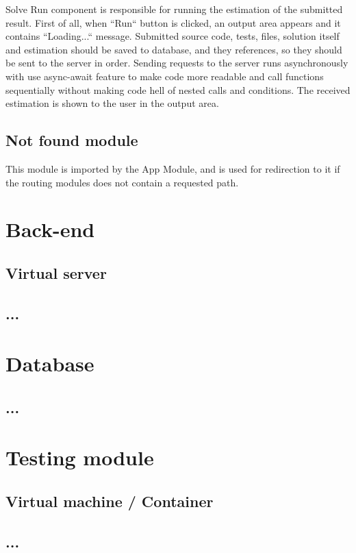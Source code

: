 Solve Run component is responsible for running the estimation of the submitted result. First of all, when ``Run`` button is clicked, an output area appears and it contains ``Loading...`` message. Submitted source code, tests, files, solution itself and estimation should be saved to database, and they references, so they should be sent to the server in order. Sending requests to the server runs asynchronously with use async-await feature to make code more readable and call functions sequentially without making code hell of nested calls and conditions. The received estimation is shown to the user in the output area.

\subsection{Not found module}
This module is imported by the App Module, and is used for redirection to it if the routing modules does not contain a requested path.


\section{Back-end}

\subsection{Virtual server}

\subsection{...}

\section{Database}

\subsection{...}

\section{Testing module}

\subsection{Virtual machine / Container}

\subsection{...}